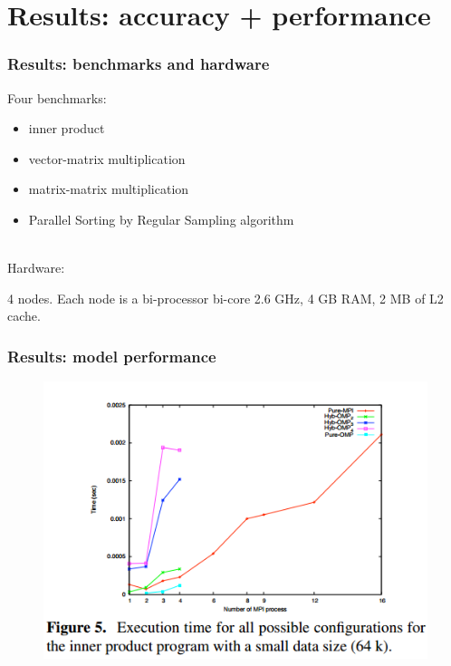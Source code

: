 \documentclass{beamer}
\begin{document}




\section{Results: accuracy + performance}

\begin{frame}
\frametitle{Results: benchmarks and hardware}

Four benchmarks:

\begin{itemize}

\item inner product
\item vector-matrix multiplication
\item matrix-matrix multiplication
\item Parallel Sorting by Regular Sampling algorithm

\end{itemize}

\ \\

Hardware:

4 nodes. Each node is a bi-processor bi-core 2.6 GHz, 4 GB RAM, 2 MB of L2 cache.

\end{frame}


\begin{frame}
\frametitle{Results: model performance}

\begin{figure}
\includegraphics[width=0.8\linewidth]{results-plots1}
\end{figure}

\end{frame}
\end{document}
